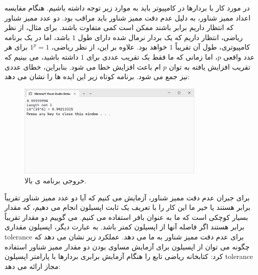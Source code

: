 {
    \Large
    \begin{spacing}{1.5}
        در مورد کار با بردارها در کامپیوتر باید به موارد زیر توجه داشته باشیم.
        هنگام مقایسه اعداد ممیز شناور، به دلیل عدم دقت ممیز شناور باید مراقب بود.
        دو عدد ممیز شناور که انتظار داریم برابر باشند ممکن است کمی متفاوت باشند.
        برای مثال، از نظر ریاضی، انتظار داریم که یک بردار نرمال شده دارای طول $1$ باشد، اما در یک برنامه کامپیوتری، طول آن تقریباً $1$ خواهد بود.
        علاوه بر این، از نظر ریاضی، $1^p=1$ برای هر عدد واقعی $p$، اما زمانی که ما فقط یک تقریب عددی برای $1$ داشته باشید، می بینیم که تقریب افزایش یافته به توان $p$ ام باعث افزایش خطا می شود.
        بنابراین، خطای عددی نیز جمع می شود. برنامه کوتاه زیر این ایده ها را نشان می دهد:
        \textbf{\vspace{6pt}}
        \lr{}
        \textbf{\vspace{-30pt}}
        \begin{figure}[H]
            \centering
            \setlength{\belowcaptionskip}{-10pt}
            \includegraphics[width=0.8\textwidth]{Images/4/1/4.Session.1.1.20}
            \caption {خروجی برنامه ی بالا.}
            \label{fig:4.Session.1.1.20}
        \end{figure}

        برای جبران عدم دقت ممیز شناور، آزمایش می کنیم که آیا دو عدد ممیز شناور تقریباً برابر هستند یا خیر
        ما این کار را با تعریف یک ثابت اپسیلون انجام می دهیم، که مقدار بسیار کوچکی است که ما به عنوان بافر استفاده می کنیم.
        می گوییم دو مقدار تقریباً برابر هستند اگر فاصله آنها از اپسیلون کمتر باشد.
        به عبارت دیگر، اپسیلون مقداری tolerance برای عدم دقت ممیز شناور به ما می دهد.
        عملکرد زیر نشان می دهد که چگونه می توان از اپسیلون برای آزمایش مساوی بودن دو مقدار ممیز شناور استفاده کرد:
        \textbf{\vspace{6pt}}
        \lr{}
        \textbf{\vspace{6pt}}
        کتابخانه ریاضی  تابع  را هنگام آزمایش برابری بردارها با پارامتر اپسیلون tolerance مجاز ارائه می دهد:
        \textbf{\vspace{6pt}}
        \lr{}
    \end{spacing}
}
\newpage

